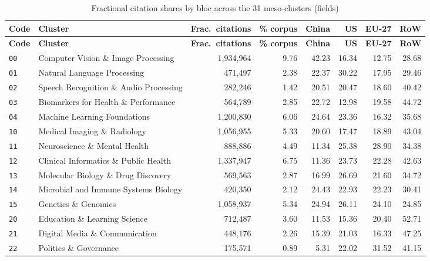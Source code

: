\begin{longtable}{@{}l l r r r r r r@{}}
\caption{Fractional citation shares by bloc across the 31 meso-clusters (fields)}\label{tab:s2}\\
\toprule
\textbf{Code} & \textbf{Cluster} & \textbf{Frac.\ citations} & \textbf{\% corpus} & \textbf{China} & \textbf{US} & \textbf{EU-27} & \textbf{RoW} \\
\midrule
\endfirsthead
\toprule
\textbf{Code} & \textbf{Cluster} & \textbf{Frac.\ citations} & \textbf{\% corpus} & \textbf{China} & \textbf{US} & \textbf{EU-27} & \textbf{RoW} \\
\midrule
\endhead
\bottomrule
\endlastfoot
\texttt{00} & Computer Vision \& Image Processing & 1,934,964 & 9.76 & 42.23 & 16.34 & 12.75 & 28.68 \\
\texttt{01} & Natural Language Processing & 471,497 & 2.38 & 22.37 & 30.22 & 17.95 & 29.46 \\
\texttt{02} & Speech Recognition \& Audio Processing & 282,246 & 1.42 & 20.51 & 20.47 & 18.60 & 40.42 \\
\texttt{03} & Biomarkers for Health \& Performance & 564,789 & 2.85 & 22.72 & 12.98 & 19.58 & 44.72 \\
\texttt{04} & Machine Learning Foundations & 1,200,830 & 6.06 & 24.64 & 23.36 & 16.32 & 35.68 \\
\texttt{10} & Medical Imaging \& Radiology & 1,056,955 & 5.33 & 20.60 & 17.47 & 18.89 & 43.04 \\
\texttt{11} & Neuroscience \& Mental Health & 888,886 & 4.49 & 11.34 & 25.38 & 28.90 & 34.38 \\
\texttt{12} & Clinical Informatics \& Public Health & 1,337,947 & 6.75 & 11.36 & 23.73 & 22.28 & 42.63 \\
\texttt{13} & Molecular Biology \& Drug Discovery & 569,563 & 2.87 & 16.99 & 26.69 & 21.60 & 34.72 \\
\texttt{14} & Microbial and Immune Systems Biology & 420,350 & 2.12 & 24.43 & 22.93 & 22.23 & 30.41 \\
\texttt{15} & Genetics \& Genomics & 1,058,937 & 5.34 & 24.94 & 26.11 & 24.10 & 24.85 \\
\texttt{20} & Education \& Learning Science & 712,487 & 3.60 & 11.53 & 15.36 & 20.40 & 52.71 \\
\texttt{21} & Digital Media \& Communication & 448,176 & 2.26 & 15.39 & 21.03 & 16.33 & 47.25 \\
\texttt{22} & Politics \& Governance & 175,571 & 0.89 & 5.31 & 22.02 & 31.52 & 41.15 \\

\end{longtable}
